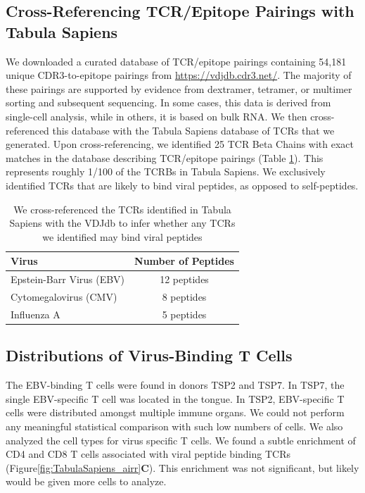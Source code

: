 \subsection{Cross-Referencing TCR/Epitope Pairings with Tabula Sapiens}

We downloaded a curated database of TCR/epitope pairings containing 54,181 unique CDR3-to-epitope pairings from \url{https://vdjdb.cdr3.net/}. The majority of these pairings are supported by evidence from dextramer, tetramer, or multimer sorting and subsequent sequencing. In some cases, this data is derived from single-cell analysis, while in others, it is based on bulk RNA. We then cross-referenced this database with the Tabula Sapiens database of TCRs that we generated. Upon cross-referencing, we identified 25 TCR Beta Chains with exact matches in the database describing TCR/epitope pairings (Table \ref{tab:TabulaSapiens_tab1_viral_peptides}). This represents roughly 1/100 of the TCRBs in Tabula Sapiens. We exclusively identified TCRs that are likely to bind viral peptides, as opposed to self-peptides.

\renewcommand{\arraystretch}{2}  %
\begin{table}[hbt!]
\centering
\begin{tabularx}{\textwidth}{Xc}  %
   \textbf{Virus} & \textbf{Number of Peptides} \\
   \hline  %
Epstein-Barr Virus (EBV) & 12 peptides \\
\hline
Cytomegalovirus (CMV) & 8 peptides \\
\hline
Influenza A & 5 peptides \\
\hline
\end{tabularx}
\caption[Table of TCR-Binding Inferences]{We cross-referenced the TCRs identified in Tabula Sapiens with the VDJdb to infer whether any TCRs we identified may bind viral peptides}
\label{tab:TabulaSapiens_tab1_viral_peptides}
\end{table}


\subsection{Distributions of Virus-Binding T Cells}
The EBV-binding T cells were found in donors TSP2 and TSP7. In TSP7, the single EBV-specific T cell was located in the tongue. In TSP2, EBV-specific T cells were distributed amongst multiple immune organs. We could not perform any meaningful statistical comparison with such low numbers of cells. We also analyzed the cell types for virus specific T cells. We found a subtle enrichment of CD4 and CD8 T cells associated with viral peptide binding TCRs (Figure\ref{fig:TabulaSapiens_airr}\textbf{C}). This enrichment was not significant, but likely would be given more cells to analyze.

